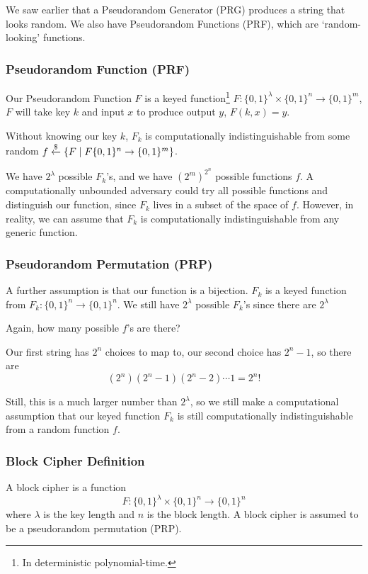 We saw earlier that a Pseudorandom Generator (PRG) produces a string that looks random. We also have Pseudorandom Functions (PRF), which are `random-looking' functions.

\subsubsection{Pseudorandom Function (PRF)}

Our Pseudorandom Function $F$ is a keyed function\footnote{In deterministic polynomial-time.} $F : \{0, 1\}^\lambda\times \{0, 1\}^n\to\{0, 1\}^m$, $F$ will take key $k$ and input $x$ to produce output $y$, $F(k, x) = y$.

Without knowing our key $k$, $F_k$ is computationally indistinguishable from some random $f\overset{\$}{\leftarrow}\{F\mid F\{0, 1\}^n\to \{0, 1\}^m\}$.


We have $2^\lambda$ possible $F_k$'s, and we have $(2^m)^{2^n}$ possible functions $f$. A computationally unbounded adversary could try all possible functions and distinguish our function, since $F_k$ lives in a subset of the space of $f$. However, in reality, we can assume that $F_k$ is computationally indistinguishable from any generic function.

\subsubsection{Pseudorandom Permutation (PRP)}

A further assumption is that our function is a bijection. $F_k$ is a keyed function from $F_k : \{0, 1\}^n\to\{0, 1\}^n$. We still have $2^\lambda$ possible $F_k$'s since there are $2^\lambda$


\begin{ques*}
    Again, how many possible $f$'s are there?
\end{ques*}
Our first string has $2^n$ choices to map to, our second choice has $2^n - 1$, so there are
\[(2^n)(2^n-1)(2^n-2)\cdots 1 = 2^n!\]

Still, this is a much larger number than $2^\lambda$, so we still make a computational assumption that our keyed function $F_k$ is still computationally indistinguishable from a random function $f$.

\subsubsection{Block Cipher Definition}
A block cipher is a function
\[F : \{0, 1\}^\lambda\times \{0, 1\}^n\to \{0, 1\}^n\]
where $\lambda$ is the key length and $n$ is the block length. A block cipher is assumed to be a pseudorandom permutation (PRP).

